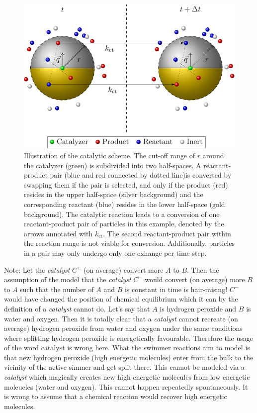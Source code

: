 \documentclass[aip,jcp,reprint,a4paper,onecolumn,nofootinbib,amsmath,amssymb]{revtex4-1}
\begin{document}
\begin{figure}
  \centering
  \includegraphics{FIGURES/number-conserving}
  \caption{\label{fig:nc}Illustration of the catalytic scheme. The cut-off range of $r$ around the catalyzer (green) is subdivided into two half-spaces. A reactant-product pair (blue and red connected by dotted line)is converted by swapping them if the pair is selected, and only if the product (red) resides in the upper half-space (silver background) and the corresponding reactant (blue) resides in the lower half-space (gold background). The catalytic reaction leads to a conversion of one reactant-product pair of particles in this example, denoted by the arrows annotated with $k_{\text{ct}}$. The second reactant-product pair within the reaction range is not viable for conversion. Additionally, particles in a pair may only undergo only one exhange per time step.}
\end{figure}

Note: Let the \textit{catalyst} $C^{+}$ (on average) convert more $A$ to $B$. Then the assumption of the model that the \textit{catalyst} $C^{-}$ would convert (on average) more $B$ to $A$ such that the number of $A$ and $B$ is constant in time is hair-raising! $C^{-}$ would have changed the position of chemical equilibrium which it can by the definition of a \textit{catalyst} cannot do. Let's say that $A$ is hydrogen peroxide and $B$ is water and oxygen. Then it is totally clear that a \textit{catalyst} cannot recreate (on average) hydrogen peroxide from water and oxygen under the same conditions where splitting hydrogen peroxide is energetically favourable. Therefore the usage of the word catalyst is wrong here. What the swimmer reactions aim to model is that new hydrogen peroxide (high energetic molecules) enter from the bulk to the vicinity of the active simmer and get split there. This cannot be modeled via a \textit{catalyst} which magically creates new high energetic molecules from low energetic moleucles (water and oxygen). This cannot happen repeatedly spontaneously. It is wrong to assume that a chemical reaction would recover high energetic molecules.
\end{document}
